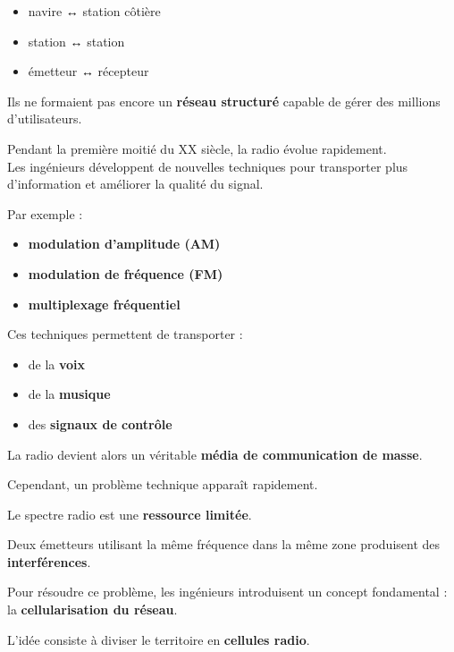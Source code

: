 \documentclass[
  french,
]{article}
\providecommand{\tightlist}{%
  \setlength{\itemsep}{0pt}\setlength{\parskip}{0pt}}
\begin{document}
\begin{itemize}
\tightlist
\item
  navire ↔ station côtière\\
\item
  station ↔ station\\
\item
  émetteur ↔ récepteur
\end{itemize}

Ils ne formaient pas encore un \textbf{réseau structuré} capable de
gérer des millions d'utilisateurs.

Pendant la première moitié du XX siècle, la radio évolue rapidement.\\
Les ingénieurs développent de nouvelles techniques pour transporter plus
d'information et améliorer la qualité du signal.

Par exemple :

\begin{itemize}
\tightlist
\item
  \textbf{modulation d'amplitude (AM)}\\
\item
  \textbf{modulation de fréquence (FM)}\\
\item
  \textbf{multiplexage fréquentiel}
\end{itemize}

Ces techniques permettent de transporter :

\begin{itemize}
\tightlist
\item
  de la \textbf{voix}
\item
  de la \textbf{musique}
\item
  des \textbf{signaux de contrôle}
\end{itemize}

La radio devient alors un véritable \textbf{média de communication de
masse}.

Cependant, un problème technique apparaît rapidement.

Le spectre radio est une \textbf{ressource limitée}.

Deux émetteurs utilisant la même fréquence dans la même zone produisent
des \textbf{interférences}.

Pour résoudre ce problème, les ingénieurs introduisent un concept
fondamental :\\
la \textbf{cellularisation du réseau}.

L'idée consiste à diviser le territoire en \textbf{cellules radio}.
\end{document}
